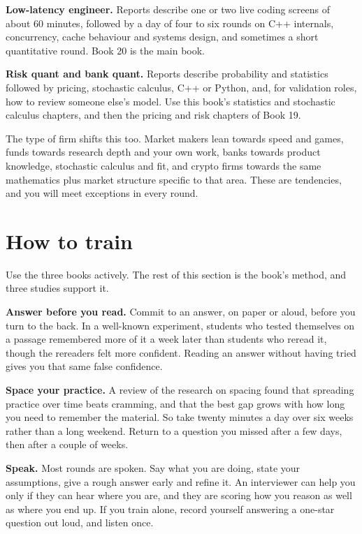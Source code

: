 \textbf{Low-latency engineer.} Reports describe one or two live coding screens of about 60 minutes, followed by a day of four to six rounds on C++ internals, concurrency, cache behaviour and systems design, and sometimes a short quantitative round. Book 20 is the main book.

\textbf{Risk quant and bank quant.} Reports describe probability and statistics followed by pricing, stochastic calculus, C++ or Python, and, for validation roles, how to review someone else's model. Use this book's statistics and stochastic calculus chapters, and then the pricing and risk chapters of Book 19.

The type of firm shifts this too. Market makers lean towards speed and games, funds towards research depth and your own work, banks towards product knowledge, stochastic calculus and fit, and crypto firms towards the same mathematics plus market structure specific to that area. These are tendencies, and you will meet exceptions in every round.

\section{How to train}

Use the three books actively. The rest of this section is the book's method, and three studies support it.

\textbf{Answer before you read.} Commit to an answer, on paper or aloud, before you turn to the back. In a well-known experiment, students who tested themselves on a passage remembered more of it a week later than students who reread it, though the rereaders felt more confident. Reading an answer without having tried gives you that same false confidence.

\textbf{Space your practice.} A review of the research on spacing found that spreading practice over time beats cramming, and that the best gap grows with how long you need to remember the material. So take twenty minutes a day over six weeks rather than a long weekend. Return to a question you missed after a few days, then after a couple of weeks.

\textbf{Speak.} Most rounds are spoken. Say what you are doing, state your assumptions, give a rough answer early and refine it. An interviewer can help you only if they can hear where you are, and they are scoring how you reason as well as where you end up. If you train alone, record yourself answering a one-star question out loud, and listen once.

